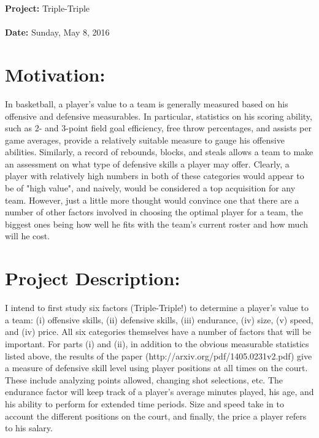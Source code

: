\documentclass[11pt]{article}
\begin{document}





\noindent
{\Large \textbf{Project:} Triple-Triple}\\ \\
\textbf{Date:} Sunday, May 8, 2016\\





\section*{Motivation:} 

In basketball, a player's value to a team is generally measured based on his offensive and defensive measurables. In particular, statistics on his scoring ability, such as 2- and 3-point field goal efficiency, free throw percentages, and assists per game averages, provide a relatively suitable measure to gauge his offensive abilities. Similarly, a record of rebounds, blocks, and steals allows a team to make an assessment on what type of defensive skills a player may offer. Clearly, a player with relatively high numbers in both of these categories would appear to be of "high value", and naively, would be considered a top acquisition for any team. However, just a little more thought would convince one that there are a number of other factors involved in choosing the optimal player for a team, the biggest ones being how well he fits with the team's current roster and how much will he cost.  

\section*{Project Description:}
I intend to first study six factors (Triple-Triple!) to determine a player's value to a team: (i) offensive skills, (ii) defensive skills, (iii) endurance, (iv) size, (v) speed, and (iv) price. All six categories themselves have a number of factors that will be important. For parts (i) and (ii), in addition to the obvious measurable statistics listed above, the results of the paper (http://arxiv.org/pdf/1405.0231v2.pdf) give a measure of defensive skill level using player positions at all times on the court. These include analyzing points allowed, changing shot selections, etc. The endurance factor will keep track of a player's average minutes played, his age, and his ability to perform for extended time periods. Size and speed take in to account the different positions on the court, and finally, the price a player refers to his salary.
\end{document}
